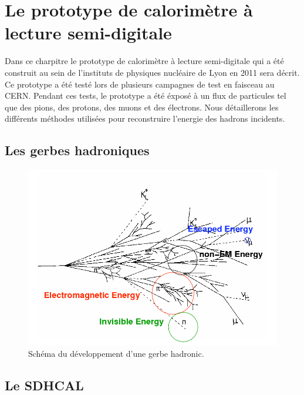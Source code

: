 \chapter{Le prototype de calorimètre à lecture semi-digitale}
\label{chap.sdhcal}
Dans ce charpitre le prototype de calorimètre à lecture semi-digitale qui a été construit au sein de l'instituts de physiques nucléaire de Lyon en 2011 sera décrit. Ce prototype a été testé lors de plusieurs campagnes de test en faisceau au CERN. Pendant ces tests, le prototype a été éxposé à un flux de particules tel que des pions, des protons, des muons et des électrons. Nous détaillerons les différents méthodes utilisées pour reconstruire l'energie des hadrons incidents. 
\minitoc
\newpage


\section{Les gerbes hadroniques}

\begin{figure}[!h]
  \begin{center}
    \includegraphics[width=.8\textwidth]{SDHCAL/figs/had-shower.png}
    \caption{Schéma du développement d'une gerbe hadronic.}
    \label{fig:showerScheme}
  \end{center}
\end{figure}


\section{Le SDHCAL}

